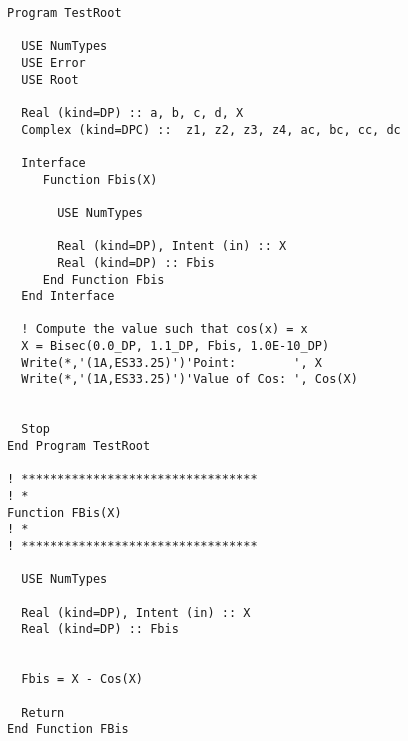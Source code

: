 \begin{lstlisting}[emph=Bisec,
                   emphstyle=\color{blue},
                   frame=trBL,
                   caption=Computing roots with the bisection method.,
                   label=bisec]
Program TestRoot

  USE NumTypes
  USE Error
  USE Root

  Real (kind=DP) :: a, b, c, d, X
  Complex (kind=DPC) ::  z1, z2, z3, z4, ac, bc, cc, dc

  Interface
     Function Fbis(X)
       
       USE NumTypes
       
       Real (kind=DP), Intent (in) :: X
       Real (kind=DP) :: Fbis
     End Function Fbis
  End Interface
  
  ! Compute the value such that cos(x) = x
  X = Bisec(0.0_DP, 1.1_DP, Fbis, 1.0E-10_DP)
  Write(*,'(1A,ES33.25)')'Point:        ', X
  Write(*,'(1A,ES33.25)')'Value of Cos: ', Cos(X)


  Stop
End Program TestRoot

! *********************************
! *
Function FBis(X)
! *
! *********************************  

  USE NumTypes
  
  Real (kind=DP), Intent (in) :: X
  Real (kind=DP) :: Fbis

  
  Fbis = X - Cos(X)

  Return
End Function FBis
\end{lstlisting}




